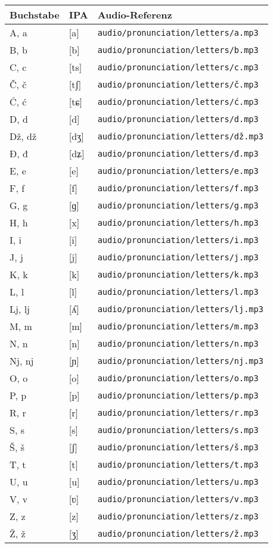 \begin{center}
\begin{tabular}{lll}
\toprule
\textbf{Buchstabe} & \textbf{IPA} & \textbf{Audio-Referenz} \\
\midrule
A, a & [a] & \texttt{audio/pronunciation/letters/a.mp3} \\
B, b & [b] & \texttt{audio/pronunciation/letters/b.mp3} \\
C, c & [ts] & \texttt{audio/pronunciation/letters/c.mp3} \\
Č, č & [tʃ] & \texttt{audio/pronunciation/letters/č.mp3} \\
Ć, ć & [tɕ] & \texttt{audio/pronunciation/letters/ć.mp3} \\
D, d & [d] & \texttt{audio/pronunciation/letters/d.mp3} \\
Dž, dž & [dʒ] & \texttt{audio/pronunciation/letters/dž.mp3} \\
Đ, đ & [dʑ] & \texttt{audio/pronunciation/letters/đ.mp3} \\
E, e & [e] & \texttt{audio/pronunciation/letters/e.mp3} \\
F, f & [f] & \texttt{audio/pronunciation/letters/f.mp3} \\
G, g & [ɡ] & \texttt{audio/pronunciation/letters/g.mp3} \\
H, h & [x] & \texttt{audio/pronunciation/letters/h.mp3} \\
I, i & [i] & \texttt{audio/pronunciation/letters/i.mp3} \\
J, j & [j] & \texttt{audio/pronunciation/letters/j.mp3} \\
K, k & [k] & \texttt{audio/pronunciation/letters/k.mp3} \\
L, l & [l] & \texttt{audio/pronunciation/letters/l.mp3} \\
Lj, lj & [ʎ] & \texttt{audio/pronunciation/letters/lj.mp3} \\
M, m & [m] & \texttt{audio/pronunciation/letters/m.mp3} \\
N, n & [n] & \texttt{audio/pronunciation/letters/n.mp3} \\
Nj, nj & [ɲ] & \texttt{audio/pronunciation/letters/nj.mp3} \\
O, o & [o] & \texttt{audio/pronunciation/letters/o.mp3} \\
P, p & [p] & \texttt{audio/pronunciation/letters/p.mp3} \\
R, r & [r] & \texttt{audio/pronunciation/letters/r.mp3} \\
S, s & [s] & \texttt{audio/pronunciation/letters/s.mp3} \\
Š, š & [ʃ] & \texttt{audio/pronunciation/letters/š.mp3} \\
T, t & [t] & \texttt{audio/pronunciation/letters/t.mp3} \\
U, u & [u] & \texttt{audio/pronunciation/letters/u.mp3} \\
V, v & [ʋ] & \texttt{audio/pronunciation/letters/v.mp3} \\
Z, z & [z] & \texttt{audio/pronunciation/letters/z.mp3} \\
Ž, ž & [ʒ] & \texttt{audio/pronunciation/letters/ž.mp3} \\
\bottomrule
\end{tabular}
\end{center}


